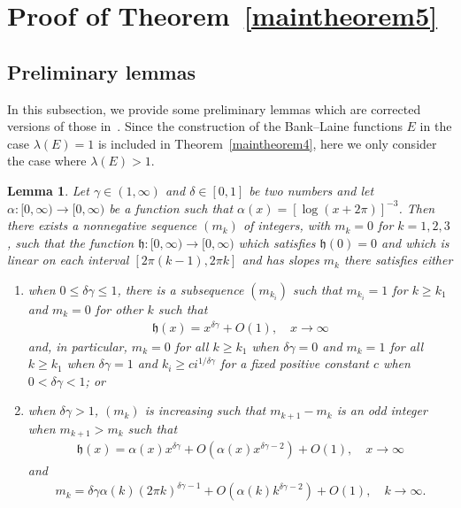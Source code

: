 \documentclass[12pt]{amsart}
\numberwithin{equation}{section}
\newtheorem{lemma}[theorem]{Lemma}
\begin{document}
\section{Proof of Theorem~\ref{maintheorem5}}\label{Proof of maintheorem5} %

\subsection{Preliminary lemmas}\label{Preliminary lemmas-add} %

In this subsection, we provide some preliminary lemmas which are corrected versions of those in~\cite[Section~2]{Zhang2024}. Since the construction of the Bank--Laine functions $E$ in the case $\lambda(E)=1$ is included in Theorem~\ref{maintheorem4}, here we only consider the case where $\lambda(E)>1$.

\begin{lemma}\label{Lemma1}
Let $\gamma\in(1,\infty)$ and $\delta\in[0,1]$ be two numbers and let $\alpha:[0,\infty)\to[0,\infty)$ be a function such that $\alpha(x)=[\log(x+2\pi)]^{-3}$. Then there exists a nonnegative sequence $(m_k)$ of integers, with $m_k=0$ for $k=1,2,3$, such that the function $\mathfrak{h}:[0,\infty)\to[0,\infty)$ which satisfies $\mathfrak{h}(0)=0$ and which is linear on each interval $[2\pi (k-1), 2\pi k]$ and has slopes $m_k$ there satisfies either
\begin{enumerate}
 \item [(1)]
when $0\leq \delta\gamma \leq 1$, there is a subsequence $(m_{k_i})$ such that $m_{k_i}=1$ for $k\geq k_1$ and $m_{k}=0$ for other $k$ such that
\begin{equation*}%
\begin{split}
\mathfrak{h}(x)=x^{\delta\gamma}+O(1), \quad x\to\infty
\end{split}
\end{equation*}
and, in particular, $m_k=0$ for all $k\geq k_1$ when $\delta\gamma=0$ and $m_k=1$ for all $k\geq k_1$ when $\delta\gamma=1$ and $k_{i}\geq c i^{1/\delta\gamma}$ for a fixed positive constant $c$ when $0<\delta\gamma<1$; or

\item [(2)]
when $\delta\gamma>1$, $(m_k)$ is increasing such that $m_{k+1}-m_k$ is an odd integer when $m_{k+1}>m_k$ such that
\begin{equation*}%
\begin{split}
\mathfrak{h}(x)=\alpha(x)x^{\delta\gamma}+O\left(\alpha(x)x^{\delta\gamma-2}\right)+O(1), \quad x\to\infty
\end{split}
\end{equation*}
and
\begin{equation*}%
\begin{split}
m_k=\delta\gamma\alpha(k)(2\pi k)^{\delta\gamma-1}+O\left(\alpha(k)k^{\delta\gamma-2}\right)+O(1), \quad k\to\infty.
\end{split}
\end{equation*}
\end{enumerate}

\end{lemma}
\end{document}
